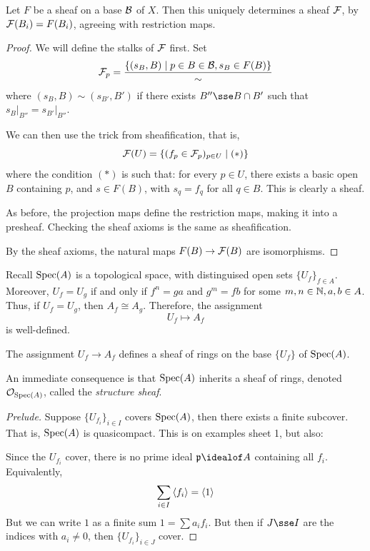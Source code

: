 \documentclass{article}
\begin{document}
\begin{proposition}
    Let \(F\) be a sheaf on a base \(\mathcal{B}\) of \(X\). Then this uniquely determines a sheaf \(\mathcal{F}\), by \(\mathcal{F}(B_i) = F(B_i)\), agreeing with restriction maps.
\end{proposition}

\begin{proof}
    We will define the stalks of \(\mathcal{F}\) first. Set
    \[\mathcal{F}_p = \frac{\{(s_B, B) \mid p \in B \in \mathcal{B}, s_B \in F(B)\}}{\sim}\]
    where \((s_B, B) \sim (s_{B'}, B')\) if there exists \(B'' \sse B \cap B'\) such that \(s_B\vert_{B''} = s_{B'}\vert_{B''}\).

    We can then use the trick from sheafification, that is,
    \[\mathcal{F}(U) = \left\{(f_p \in \mathcal{F}_p)_{p \in U} \mid (*)\right\}\]
    where the condition \((*)\) is such that: for every \(p \in U\), there exists a basic open \(B\) containing \(p\), and \(s \in F(B)\), with \(s_q = f_q\) for all \(q \in B\). This is clearly a sheaf. \begin{addendum}
        As before, the projection maps define the restriction maps, making it into a presheaf. Checking the sheaf axioms is the same as sheafification.
    \end{addendum}

    By the sheaf axioms, the natural maps \(F(B) \to \mathcal{F}(B)\) are isomorphisms.
\end{proof}

\lec

Recall \(\operatorname{Spec}(A)\) is a topological space, with distinguised open sets \(\{U_f\}_{f \in A}\). Moreover, \(U_f = U_g\) if and only if \(f^n = ga\) and \(g^m = fb\) for some \(m, n \in \mathbb{N}, a, b \in A\). Thus, if \(U_f = U_g\), then \(A_f \cong A_g\). Therefore, the assignment
\[U_f \mapsto A_f\]
is well-defined.

\begin{proposition}
    \label{prop:sheaf-of-rings-on-base}
    The assignment \(U_f \to A_f\) defines a sheaf of rings on the base \(\{U_f\}\) of \(\operatorname{Spec}(A)\).
\end{proposition}

An immediate consequence is that \(\operatorname{Spec}(A)\) inherits a sheaf of rings, denoted \(\mathcal{O}_{\operatorname{Spec}(A)}\), called the \emph{structure sheaf}.

\begin{proof}
    [Prelude] Suppose \(\{U_{f_i}\}_{i \in I}\) covers \(\operatorname{Spec}(A)\), then there exists a finite subcover. That is, \(\operatorname{Spec}(A)\) is quasicompact. This is on examples sheet 1, but also:

    Since the \(U_{f_i}\) cover, there is no prime ideal \(\mfp \idealof A\) containing all \(f_i\). Equivalently,
    \[\sum_{i \in I}\left\langle f_i \right\rangle = \left\langle 1 \right\rangle\]
    But we can write \(1\) as a finite sum \(1 = \sum a_i f_i\). But then if \(J \sse I\) are the indices with \(a_i \ne 0\), then \(\{U_{f_i}\}_{i \in J}\) cover. 
\end{proof}
\end{document}
